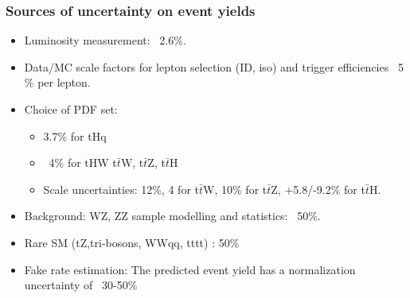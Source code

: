\documentclass[11pt]{beamer}
\begin{document}
\begin{frame}
\frametitle{Sources of uncertainty on event yields}
\begin{itemize}
\item Luminosity measurement: ~2.6$\%$.
\item Data/MC scale factors for lepton selection (ID, iso) and trigger efficiencies ~5$\%$ per lepton.
\item Choice of PDF set:
\begin{itemize}
 \item 3.7$\%$ for tHq
 \item ~4$\%$ for tHW t$\bar{t}$W, t$\bar{t}$Z, t$\bar{t}$H 
 \item Scale uncertainties: 12$\%$, 4 for t$\bar{t}$W, 10$\%$ for t$\bar{t}$Z, +5.8/-9.2$\%$ for t$\bar{t}$H.
\end{itemize}
 \item Background: WZ, ZZ sample modelling and statistics: ~50$\%$.
 \item Rare SM (tZ,tri-bosons, WWqq, tttt) : 50$\%$
 \item Fake rate estimation:
 The predicted event yield has a normalization uncertainty of ~30-50$\%$ \cite{7}
\end{itemize}

\end{frame}
\end{document}
